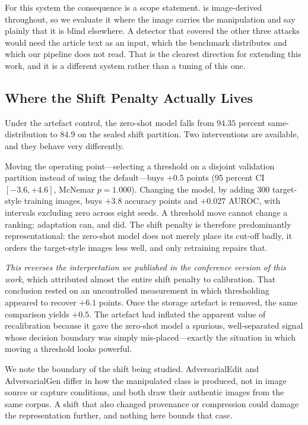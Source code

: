 For this system the consequence is a scope statement. \sysname{} is
image-derived throughout, so we evaluate it where the image carries the
manipulation and say plainly that it is blind elsewhere. A detector that
covered the other three attacks would need the article text as an input, which
the benchmark distributes and which our pipeline does not read. That is the
clearest direction for extending this work, and it is a different system rather
than a tuning of this one.

\subsection{Where the Shift Penalty Actually Lives}
\label{sec:shiftdiscussion}

Under the artefact control, the zero-shot model falls from $94.35$ percent
same-distribution to $84.9$ on the sealed shift partition. Two interventions
are available, and they behave very differently.

Moving the operating point---selecting a threshold on a disjoint validation
partition instead of using the default---buys $+0.5$ points
(95 percent CI $[-3.6, +4.6]$, McNemar $p = 1.000$). Changing the model, by
adding 300 target-style training images, buys $+3.8$ accuracy points and
$+0.027$ AUROC, with intervals excluding zero across eight seeds. A threshold
move cannot change a ranking; adaptation can, and did. The shift penalty is
therefore predominantly representational: the zero-shot model does not merely
place its cut-off badly, it orders the target-style images less well, and only
retraining repairs that.

\emph{This reverses the interpretation we published in the conference version
of this work}, which attributed almost the entire shift penalty to calibration.
That conclusion rested on an uncontrolled measurement in which thresholding
appeared to recover $+6.1$ points. Once the storage artefact is removed, the
same comparison yields $+0.5$. The artefact had inflated the apparent value of
recalibration because it gave the zero-shot model a spurious, well-separated
signal whose decision boundary was simply mis-placed---exactly the situation in
which moving a threshold looks powerful.

We note the boundary of the shift being studied. AdversarialEdit and
AdversarialGen differ in how the manipulated class is produced, not in image
source or capture conditions, and both draw their authentic images from the
same corpus. A shift that also changed provenance or compression could damage
the representation further, and nothing here bounds that case.

